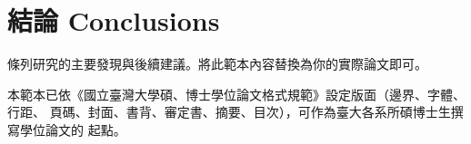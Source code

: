 \chapter{結論 Conclusions}
\label{ch:conclusion}

條列研究的主要發現與後續建議。將此範本內容替換為你的實際論文即可。

本範本已依《國立臺灣大學碩、博士學位論文格式規範》設定版面（邊界、字體、行距、
頁碼、封面、書背、審定書、摘要、目次），可作為臺大各系所碩博士生撰寫學位論文的
起點。
